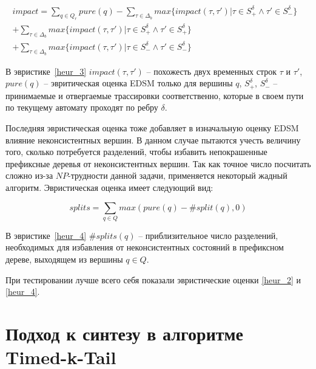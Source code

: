 \documentclass[times,specification,annotation]{itmo-student-thesis}
\begin{document}
\begin{equation}
  \begin{split}
    impact = \mathop{\sum}\limits_{q \in Q_r}pure(q) - \mathop{\sum}\limits_{\tau \in \Delta_b}max\{impact(\tau, \tau') | \tau \in S^\delta_+ \land \tau' \in S^\delta_-\}& \\
						     + \mathop{\sum}\limits_{\tau \in \Delta_b}max\{impact(\tau, \tau') | \tau \in S^\delta_+ \land \tau' \in S^\delta_+\}& \\ 
						     + \mathop{\sum}\limits_{\tau \in \Delta_b}max\{impact(\tau, \tau') | \tau \in S^\delta_- \land \tau' \in S^\delta_-\}&
  \end{split}
  \label{heur_3}
\end{equation}

В эвристике~\ref{heur_3} $impact(\tau, \tau')$ -- похожесть двух временных строк $\tau$ и $\tau'$, $pure(q)$ -- эвритическая оценка EDSM только для вершины $q$, 
$S^\delta_+$, $S^\delta_-$ -- принимаемые и отвергаемые трассировки соответственно, которые в своем пути по текущему автомату проходят по ребру $\delta$.

Последняя эвристическая оценка тоже добавляет в изначальную оценку EDSM влияние неконсистентных вершин. В данном случае пытаются учесть величину того,
сколько потребуется разделений, чтобы избавить непокрашенные префиксные деревья от неконсистентных вершин. Так как точное число посчитать сложно из-за $NP$-трудности
данной задачи, применяется некоторый жадный алгоритм. Эвристическая оценка имеет следующий вид:

\begin{equation}
  splits = \mathop{\sum}\limits_{q \in Q}max(pure(q) - \#split(q), 0)
  \label{heur_4}
\end{equation}

В эвристике~\ref{heur_4} $\#splits(q)$ -- приблизительное число разделений, необходимых для избавления от неконсистентных состояний в префиксном дереве, выходящем из вершины $q \in Q$.

При тестировании лучше всего себя показали эвристические оценки \ref{heur_2} и \ref{heur_4}.

\section{Подход к синтезу в алгоритме Timed-k-Tail}
\end{document}
